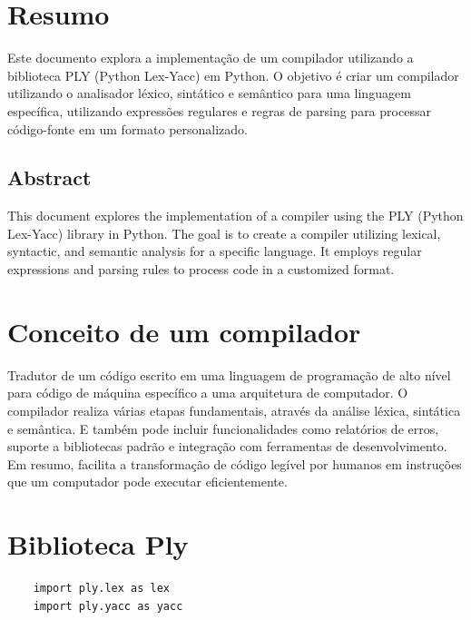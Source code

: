 \documentclass[a4paper,12pt]{article}
\begin{document}
\renewcommand{\contentsname}{Sumário}
\tableofcontents

\newpage

\section{Resumo}

Este documento explora a implementação de um compilador utilizando a 
biblioteca PLY (Python Lex-Yacc) em Python. O objetivo é criar um 
compilador utilizando o analisador léxico, sintático e semântico para 
uma linguagem específica, utilizando expressões regulares e regras de 
parsing para processar código-fonte em um formato personalizado.\\

\subsection{Abstract}

This document explores the implementation of a compiler using the PLY 
(Python Lex-Yacc) library in Python. The goal is to create a compiler 
utilizing lexical, syntactic, and semantic analysis for a specific 
language. It employs regular expressions and parsing rules to process 
code in a customized format.\\

\section{Conceito de um compilador}
Tradutor de um código escrito em uma linguagem de programação de alto nível para código de máquina específico a uma arquitetura de computador. O compilador realiza várias etapas fundamentais, através da análise léxica, sintática e semântica. E também pode incluir funcionalidades como relatórios de erros, suporte a bibliotecas padrão e integração com ferramentas de desenvolvimento. Em resumo, facilita a transformação de código legível por humanos em instruções que um computador pode executar eficientemente. 

\section{Biblioteca Ply} 


\begin{BVerbatim}
    import ply.lex as lex
    import ply.yacc as yacc    
\end{BVerbatim}
\\
\end{document}

